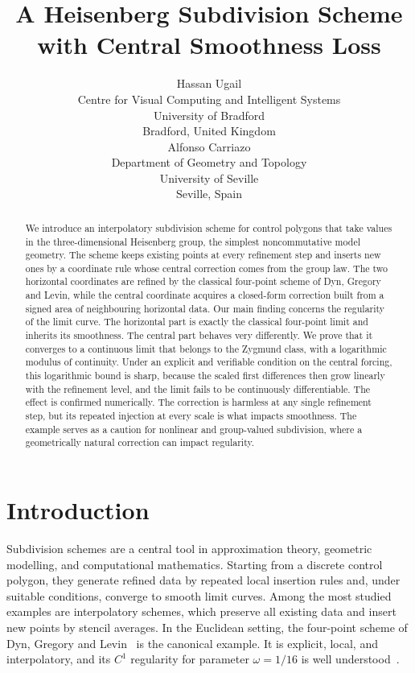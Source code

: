 \documentclass{article}
\title{A Heisenberg Subdivision Scheme with Central Smoothness Loss}
\author{
  Hassan Ugail \\
  Centre for Visual Computing and Intelligent Systems \\
  University of Bradford \\
  Bradford, United Kingdom \\
  \And
  Alfonso Carriazo \\
  Department of Geometry and Topology \\
  University of Seville \\
  Seville, Spain \\
}
\theoremstyle{plain}
\theoremstyle{definition}
\begin{document}
\maketitle

\begin{abstract}
We introduce an interpolatory subdivision scheme for control polygons that take
values in the three-dimensional Heisenberg group, the simplest noncommutative
model geometry. The scheme keeps existing points at every refinement step and
inserts new ones by a coordinate rule whose central correction comes from the
group law. The two horizontal coordinates are refined by the classical
four-point scheme of Dyn, Gregory and Levin, while the central coordinate
acquires a closed-form correction built from a signed area of neighbouring
horizontal data. Our main finding concerns the regularity of the limit curve. The horizontal part is exactly the classical four-point limit and inherits its smoothness. The central part behaves very differently. We prove that it converges to a
continuous limit that belongs to the Zygmund class, with a logarithmic modulus
of continuity. Under an explicit and verifiable condition on the central
forcing, this logarithmic bound is sharp, because the scaled first differences
then grow linearly with the refinement level, and the limit fails to be
continuously differentiable. The effect is confirmed numerically. The correction
is harmless at any single refinement step, but its repeated injection at every
scale is what impacts smoothness. The example serves as a caution for nonlinear
and group-valued subdivision, where a geometrically natural correction can
impact regularity.
\end{abstract}


\section{Introduction}\label{sec:intro}

Subdivision schemes are a central tool in approximation theory, geometric
modelling, and computational mathematics. Starting from a discrete control
polygon, they generate refined data by repeated local insertion rules and,
under suitable conditions, converge to smooth limit curves. Among the most
studied examples are interpolatory schemes, which preserve all existing data
and insert new points by stencil averages. In the Euclidean setting, the
four-point scheme of Dyn, Gregory and Levin~\cite{DGL87} is the canonical
example. It is explicit, local, and interpolatory, and its $C^1$ regularity
for parameter $\omega=1/16$ is well understood~\cite{Dyn92, DynLevin02, Zorin00}.
\end{document}
